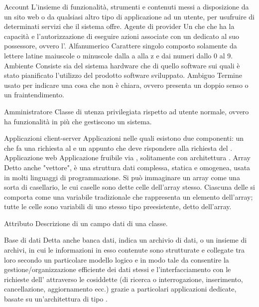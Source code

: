 \elemento
{Account} 
{L'insieme di funzionalità, strumenti e contenuti messi a disposizione da un sito web o da qualsiasi altro tipo di applicazione ad un utente, per usufruire di determinati servizi che il sistema offre.}
\elemento
{Agente di provider} 
{Un  che che ha la capacità e l'autorizzazione di eseguire azioni associate con un  dedicato al suo possessore, ovvero l'.}
\elemento
{Alfanumerico}
{Carattere singolo composto solamente da lettere latine maiuscole o minuscole dalla a alla z e dai numeri dallo 0 al 9.}
\elemento
{Ambiente}
{Consiste sia del sistema hardware che di quello software sui quali è stato pianificato l'utilizzo del prodotto software sviluppato.}
\elemento
{Ambiguo}
{Termine usato per indicare una cosa che non è chiara, ovvero presenta un doppio senso o un fraintendimento.}

\elemento
{Amministratore} 
{Classe di utenza privilegiata rispetto ad utente normale, ovvero ha funzionalità in più che gestiscono un sistema.}

\elemento
{Applicazioni client-server}
{Applicazioni nelle quali esistono due componenti: un  che fa una richiesta al  e un  appunto che deve rispondere alla richiesta del .}
\elemento
{Applicazione web} 
{Applicazione fruibile via , solitamente con architettura .}
\elemento
{Array} 
{Detto anche "vettore", è una struttura dati complessa, statica e omogenea, usata in molti linguaggi di programmazione. Si può immaginare un array come una sorta di casellario, le cui caselle sono dette celle dell'array stesso. Ciascuna delle  si comporta come una variabile tradizionale che rappresenta un elemento dell'array; tutte le celle sono variabili di uno stesso tipo preesistente, detto  dell'array.}

\elemento
{Attributo}
{Descrizione di un campo dati di una classe.}

\elemento
{Base di dati} 
{Detta anche banca dati, indica un archivio di dati, o un insieme di archivi, in cui le informazioni in esso contenute sono strutturate e collegate tra loro secondo un particolare modello logico e in modo tale da consentire la gestione/organizzazione efficiente dei dati stessi e l'interfacciamento con le richieste dell' attraverso le cosiddette  (di ricerca o interrogazione, inserimento, cancellazione, aggiornamento ecc.) grazie a particolari applicazioni  dedicate, basate su un'architettura di tipo .}

